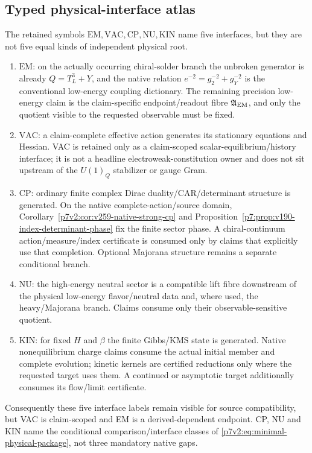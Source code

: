 \documentclass[12pt,a4paper]{article}
\begin{document}
\subsection{Typed physical-interface atlas}
\label{p7:sec:v236-interface-atlas}
\begin{theorem}
\label{p7:thm:v236-five-interface-types}
The retained symbols \(\mathrm{EM},\mathrm{VAC},\mathrm{CP},\mathrm{NU},\mathrm{KIN}\)
name five interfaces, but they are not five equal kinds of independent
physical root.
\begin{enumerate}[label=(\roman*),leftmargin=2.2em]
\item \(\mathrm{EM}\): on the actually occurring chiral-solder branch the
unbroken generator is already \(Q=T_L^3+Y\), and the native relation
\(e^{-2}=g_2^{-2}+g_Y^{-2}\) is the conventional low-energy coupling dictionary.  The remaining precision
low-energy claim is the claim-specific endpoint/readout fibre
\(\mathfrak A_{\rm EM}\), and only the quotient visible to the requested
observable must be fixed.
\item \(\mathrm{VAC}\): a claim-complete effective action generates its
stationary equations and Hessian.  VAC is retained only as a claim-scoped
scalar-equilibrium/history interface; it is not a headline electroweak-constitution
owner and does not sit upstream of the \(U(1)_Q\) stabilizer or gauge Gram.
\item \(\mathrm{CP}\): ordinary finite complex Dirac duality/CAR/determinant
structure is generated.  On the native complete-action/source domain,
Corollary~\ref{p7v2:cor:v259-native-strong-cp} and
Proposition~\ref{p7:prop:v190-index-determinant-phase} fix the finite
sector phase.  A chiral-continuum action/measure/index certificate is consumed
only by claims that explicitly use that completion.  Optional Majorana
structure remains a separate conditional branch.
\item \(\mathrm{NU}\): the high-energy neutral sector is a compatible lift
fibre downstream of the physical low-energy flavor/neutral data and, where
used, the heavy/Majorana branch.  Claims consume only their
observable-sensitive quotient.
\item \(\mathrm{KIN}\): for fixed \(H\) and \(\beta\) the finite Gibbs/KMS
state is generated.  Native nonequilibrium charge claims consume the actual
initial member and complete evolution; kinetic kernels are certified
reductions only where the requested target uses them.  A continued or
asymptotic target additionally consumes its flow/limit certificate.
\end{enumerate}
Consequently these five interface labels remain visible for source compatibility,
but VAC is claim-scoped and EM is a derived-dependent endpoint.  CP, NU and
KIN name the conditional comparison/interface classes of
\eqref{p7v2:eq:minimal-physical-package}, not three mandatory native gaps.
\end{theorem}
\end{document}
